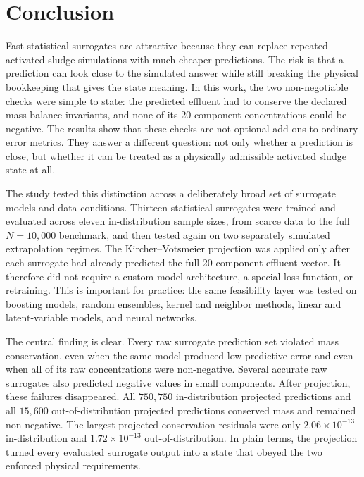 \documentclass[a4paper,fleqn]{cas-sc}
\begin{document}
\FloatBarrier
\section{Conclusion}

Fast statistical surrogates are attractive because they can replace repeated activated sludge simulations with much cheaper predictions. The risk is that a prediction can look close to the simulated answer while still breaking the physical bookkeeping that gives the state meaning. In this work, the two non-negotiable checks were simple to state: the predicted effluent had to conserve the declared mass-balance invariants, and none of its 20 component concentrations could be negative. The results show that these checks are not optional add-ons to ordinary error metrics. They answer a different question: not only whether a prediction is close, but whether it can be treated as a physically admissible activated sludge state at all.

The study tested this distinction across a deliberately broad set of surrogate models and data conditions. Thirteen statistical surrogates were trained and evaluated across eleven in-distribution sample sizes, from scarce data to the full $N=10{,}000$ benchmark, and then tested again on two separately simulated extrapolation regimes. The Kircher--Votsmeier projection was applied only after each surrogate had already predicted the full 20-component effluent vector. It therefore did not require a custom model architecture, a special loss function, or retraining. This is important for practice: the same feasibility layer was tested on boosting models, random ensembles, kernel and neighbor methods, linear and latent-variable models, and neural networks.

The central finding is clear. Every raw surrogate prediction set violated mass conservation, even when the same model produced low predictive error and even when all of its raw concentrations were non-negative. Several accurate raw surrogates also predicted negative values in small components. After projection, these failures disappeared. All $750{,}750$ in-distribution projected predictions and all $15{,}600$ out-of-distribution projected predictions conserved mass and remained non-negative. The largest projected conservation residuals were only $2.06\times10^{-13}$ in-distribution and $1.72\times10^{-13}$ out-of-distribution. In plain terms, the projection turned every evaluated surrogate output into a state that obeyed the two enforced physical requirements.
\end{document}
